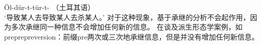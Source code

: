\begin{exe}
\begin{xlist}[iv.]
\begin{exe}
\begin{xlist}[iv.]
\ea
Öl-dür-t-tür-t- \hfill（土耳其语）\\
`导致某人去导致某人去杀某人。' 
\z 
对于这种现象，基于承继的分析不会起作用，因为多次承继同一种信息不会增加任何新的信息。 \citet{KN93a}在谈及派生形态学案例，如preprepreversion：前缀pre两次或三次地承继信息，但是并没有增加任何新信息。


\end{xlist}
\end{exe}
\end{xlist}
\end{exe}
